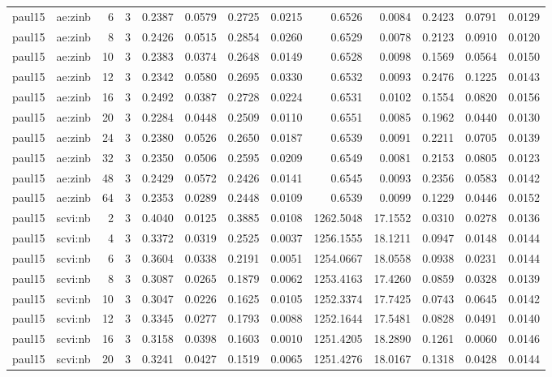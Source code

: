\begin{tabular}{llrrrrrrrrrrr}
paul15 & ae:zinb & 6 & 3 & 0.2387 & 0.0579 & 0.2725 & 0.0215 & 0.6526 & 0.0084 & 0.2423 & 0.0791 & 0.0129 \\
paul15 & ae:zinb & 8 & 3 & 0.2426 & 0.0515 & 0.2854 & 0.0260 & 0.6529 & 0.0078 & 0.2123 & 0.0910 & 0.0120 \\
paul15 & ae:zinb & 10 & 3 & 0.2383 & 0.0374 & 0.2648 & 0.0149 & 0.6528 & 0.0098 & 0.1569 & 0.0564 & 0.0150 \\
paul15 & ae:zinb & 12 & 3 & 0.2342 & 0.0580 & 0.2695 & 0.0330 & 0.6532 & 0.0093 & 0.2476 & 0.1225 & 0.0143 \\
paul15 & ae:zinb & 16 & 3 & 0.2492 & 0.0387 & 0.2728 & 0.0224 & 0.6531 & 0.0102 & 0.1554 & 0.0820 & 0.0156 \\
paul15 & ae:zinb & 20 & 3 & 0.2284 & 0.0448 & 0.2509 & 0.0110 & 0.6551 & 0.0085 & 0.1962 & 0.0440 & 0.0130 \\
paul15 & ae:zinb & 24 & 3 & 0.2380 & 0.0526 & 0.2650 & 0.0187 & 0.6539 & 0.0091 & 0.2211 & 0.0705 & 0.0139 \\
paul15 & ae:zinb & 32 & 3 & 0.2350 & 0.0506 & 0.2595 & 0.0209 & 0.6549 & 0.0081 & 0.2153 & 0.0805 & 0.0123 \\
paul15 & ae:zinb & 48 & 3 & 0.2429 & 0.0572 & 0.2426 & 0.0141 & 0.6545 & 0.0093 & 0.2356 & 0.0583 & 0.0142 \\
paul15 & ae:zinb & 64 & 3 & 0.2353 & 0.0289 & 0.2448 & 0.0109 & 0.6539 & 0.0099 & 0.1229 & 0.0446 & 0.0152 \\
paul15 & scvi:nb & 2 & 3 & 0.4040 & 0.0125 & 0.3885 & 0.0108 & 1262.5048 & 17.1552 & 0.0310 & 0.0278 & 0.0136 \\
paul15 & scvi:nb & 4 & 3 & 0.3372 & 0.0319 & 0.2525 & 0.0037 & 1256.1555 & 18.1211 & 0.0947 & 0.0148 & 0.0144 \\
paul15 & scvi:nb & 6 & 3 & 0.3604 & 0.0338 & 0.2191 & 0.0051 & 1254.0667 & 18.0558 & 0.0938 & 0.0231 & 0.0144 \\
paul15 & scvi:nb & 8 & 3 & 0.3087 & 0.0265 & 0.1879 & 0.0062 & 1253.4163 & 17.4260 & 0.0859 & 0.0328 & 0.0139 \\
paul15 & scvi:nb & 10 & 3 & 0.3047 & 0.0226 & 0.1625 & 0.0105 & 1252.3374 & 17.7425 & 0.0743 & 0.0645 & 0.0142 \\
paul15 & scvi:nb & 12 & 3 & 0.3345 & 0.0277 & 0.1793 & 0.0088 & 1252.1644 & 17.5481 & 0.0828 & 0.0491 & 0.0140 \\
paul15 & scvi:nb & 16 & 3 & 0.3158 & 0.0398 & 0.1603 & 0.0010 & 1251.4205 & 18.2890 & 0.1261 & 0.0060 & 0.0146 \\
paul15 & scvi:nb & 20 & 3 & 0.3241 & 0.0427 & 0.1519 & 0.0065 & 1251.4276 & 18.0167 & 0.1318 & 0.0428 & 0.0144 \\

\end{tabular}
